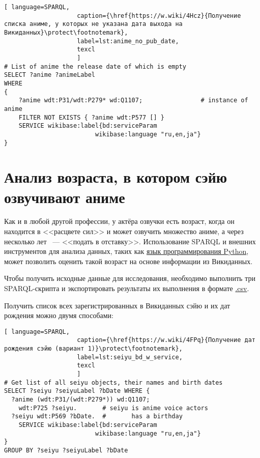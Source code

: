 \begin{lstlisting}[ language=SPARQL, 
                    caption={\href{https://w.wiki/4Hcz}{Получение списка аниме, у которых не указана дата выхода на Викиданных}\protect\footnotemark},
                    label=lst:anime_no_pub_date,
                    texcl 
                    ]
# List of anime the release date of which is empty
SELECT ?anime ?animeLabel
WHERE
{
    ?anime wdt:P31/wdt:P279* wd:Q1107;                # instance of anime
    FILTER NOT EXISTS { ?anime wdt:P577 [] }
    SERVICE wikibase:label{bd:serviceParam
					     wikibase:language "ru,en,ja"}
}
\end{lstlisting}%

\section{Анализ возраста, в котором сэйю озвучивают аниме}

Как и в любой другой профессии, у актёра озвучки есть возраст, когда он находится в <<расцвете сил>> и может озвучить множество аниме, а через несколько лет ~--- <<подать в отставку>>. Использование SPARQL и внешних инструментов для анализа данных, таких как \href{https://ru.wikipedia.org/wiki/Python}{язык программирования Python}, может позволить оценить такой возраст на основе информации из Викиданных.

Чтобы получить исходные данные для исследования, необходимо выполнить три SPARQL-скрипта и экспортировать результаты их выполнения в формате \href{https://ru.wikipedia.org/wiki/CSV}{.csv}.

Получить список всех зарегистрированных в Викиданных сэйю и их дат рождения можно двумя способами: 

\begin{lstlisting}[ language=SPARQL, 
                    caption={\href{https://w.wiki/4FPq}{Получение дат рождения сэйю (вариант 1)}\protect\footnotemark},
                    label=lst:seiyu_bd_w_service,
                    texcl 
                    ]
# Get list of all seiyu objects, their names and birth dates
SELECT ?seiyu ?seiyuLabel ?bDate WHERE {
  ?anime (wdt:P31/(wdt:P279*)) wd:Q1107;
    wdt:P725 ?seiyu.       # seiyu is anime voice actors
  ?seiyu wdt:P569 ?bDate.  #       has a birthday
    SERVICE wikibase:label{bd:serviceParam
					     wikibase:language "ru,en,ja"}
}
GROUP BY ?seiyu ?seiyuLabel ?bDate
\end{lstlisting}%

